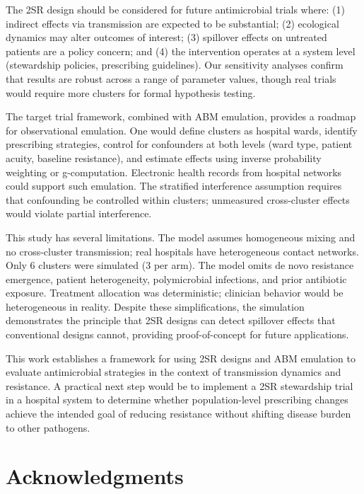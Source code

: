 \documentclass[12pt]{article}
\begin{document}
The 2SR design should be considered for future antimicrobial trials where: (1) indirect effects via transmission are expected to be substantial; (2) ecological dynamics may alter outcomes of interest; (3) spillover effects on untreated patients are a policy concern; and (4) the intervention operates at a system level (stewardship policies, prescribing guidelines). Our sensitivity analyses confirm that results are robust across a range of parameter values, though real trials would require more clusters for formal hypothesis testing.

The target trial framework, combined with ABM emulation, provides a roadmap for observational emulation. One would define clusters as hospital wards, identify prescribing strategies, control for confounders at both levels (ward type, patient acuity, baseline resistance), and estimate effects using inverse probability weighting or g-computation.\cite{tchetgen_tchetgen_causal_2012} Electronic health records from hospital networks could support such emulation. The stratified interference assumption requires that confounding be controlled within clusters; unmeasured cross-cluster effects would violate partial interference.

This study has several limitations. The model assumes homogeneous mixing and no cross-cluster transmission; real hospitals have heterogeneous contact networks. Only 6 clusters were simulated (3 per arm). The model omits de novo resistance emergence, patient heterogeneity, polymicrobial infections, and prior antibiotic exposure. Treatment allocation was deterministic; clinician behavior would be heterogeneous in reality. Despite these simplifications, the simulation demonstrates the principle that 2SR designs can detect spillover effects that conventional designs cannot, providing proof-of-concept for future applications.

This work establishes a framework for using 2SR designs and ABM emulation to evaluate antimicrobial strategies in the context of transmission dynamics and resistance. A practical next step would be to implement a 2SR stewardship trial in a hospital system to determine whether population-level prescribing changes achieve the intended goal of reducing resistance without shifting disease burden to other pathogens.

\section*{Acknowledgments}
\end{document}
